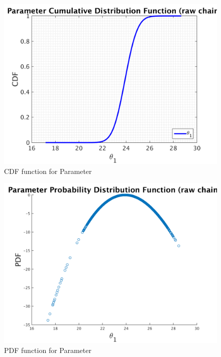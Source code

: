 \begin{figure}[H]
  
  \centering
   \includegraphics[scale=0.75]{100_results/outputData_1000000/simple_ip_cdf_raw}
   \caption{CDF function for Parameter }
\end{figure}



\begin{figure}[H]
  
  \centering
   \includegraphics[scale=0.75]{100_results/outputData_1000000/ip_logLike_unified}
   \caption{PDF function for Parameter }
\end{figure}


